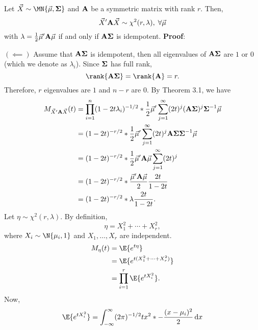 \begin{Theorem}{}{}
      Let $ \Vector{X}\sim \MN{\Vector{\mu},\Matrix{\Sigma}} $
      and $ \mathbf{A} $ be a symmetric matrix with rank $ r $.
      Then,
      \[ \vec{X}'\mathbf{A}\vec{X} \sim \chi^2(r,\lambda),\; \forall \vec{\mu} \]
      with $ \lambda=\frac{1}{2}\vec{\mu}'\mathbf{A}\vec{\mu} $ if and only if
      $ \mathbf{A\Sigma} $ is idempotent.
      \tcblower{}
      \textbf{Proof}:

      $ (\impliedby) $ Assume that $ \mathbf{A\Sigma} $ is idempotent, then
      all eigenvalues of $ \mathbf{A\Sigma} $ are $ 1 $ or $ 0 $ (which we denote as $ \lambda_i $).
      Since $ \mathbf{\Sigma} $ has full rank,
      \[ \rank{\Matrix{A\Sigma}}=\rank{\Matrix{A}}=r. \]
      Therefore,
      $ r $ eigenvalues are $ 1 $ and $ n-r $ are $ 0 $. By Theorem 3.1,
      we have
      \begin{align*}
            M_{\vec{X}'\mathbf{A}\vec{X}}(t)
             & =\prod_{i=1}^n (1-2t\lambda_i)^{-1/2}\relax*{\frac{1}{2}\vec{\mu}'\sum_{j=1}^{\infty}(2t)^j(\mathbf{A\Sigma})^j \mathbf{\Sigma}^{-1}\vec{\mu}} \\
             & =(1-2t)^{-r/2}\relax*{\frac{1}{2}\vec{\mu}'\sum_{j=1}^{\infty}(2t)^j \mathbf{A\Sigma\Sigma}^{-1}\vec{\mu}}                                     \\
             & =(1-2t)^{-r/2}\relax*{\frac{1}{2}\vec{\mu}'\mathbf{A}\vec{\mu}\sum_{j=1}^{\infty}(2t)^j}                                                       \\
             & =(1-2t)^{-r/2}\relax*{\frac{\vec{\mu}'\mathbf{A}\vec{\mu}}{2}\frac{2t}{1-2t}}                                                                  \\
             & =(1-2t)^{-r/2}\relax*{\lambda \frac{2t}{1-2t}}.
      \end{align*}
      Let $ \eta \sim \chi^2(r,\lambda) $. By definition,
      \[ \eta=X_1^2+\cdots+X_r^2, \]
      where $ X_i \sim \N{\mu_i,1} $ and $ X_1,\ldots,X_r $ are independent.
      \begin{align*}
            M_\eta(t)
             & =\E{e^{t\eta}}                 \\
             & =\E{e^{t(X_1^2+\cdots+X_r^2)}} \\
             & =\prod_{i=1}^r\E{e^{tX_i^2}}.
      \end{align*}
      Now,
      \begin{align*}
            \E{e^{tX_i^2}}
             & =\int_{-\infty}^{\infty}(2\pi)^{-1/2}\exp{tx^2}\exp*{-\frac{(x-\mu_i)^2}{2}}\odif{x}                                                                                               \\

\end{align*}
\end{Theorem}

